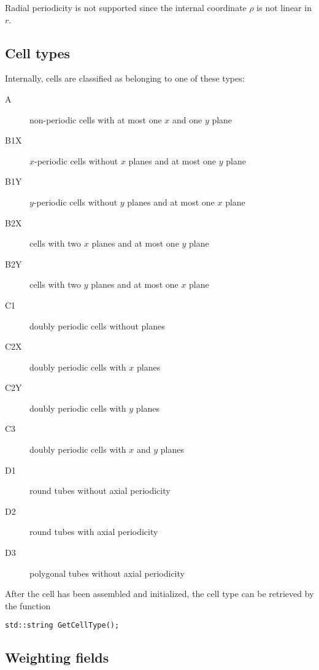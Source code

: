 Radial periodicity is not supported since the internal coordinate 
$\rho$ is not linear in $r$.

\subsection{Cell types}

Internally, cells are classified as belonging to one of these types:
\begin{description}
  \item[A]
  non-periodic cells with at most one \(x\) and one \(y\) plane
  \item[B1X]
  \(x\)-periodic cells without \(x\) planes and at most one \(y\) plane
  \item[B1Y]
  \(y\)-periodic cells without \(y\) planes and at most one \(x\) plane
  \item[B2X]
  cells with two \(x\) planes and at most one \(y\) plane
  \item[B2Y]
  cells with two \(y\) planes and at most one \(x\) plane
  \item[C1]
  doubly periodic cells without planes
  \item[C2X]
  doubly periodic cells with \(x\) planes
  \item[C2Y]
  doubly periodic cells with \(y\) planes
  \item[C3]
  doubly periodic cells with \(x\) and \(y\) planes
  \item[D1]
  round tubes without axial periodicity
  \item[D2]
  round tubes with axial periodicity
  \item[D3]
  polygonal tubes without axial periodicity
\end{description}

After the cell has been assembled and initialized, the cell type can be 
retrieved by the function
\begin{lstlisting}
std::string GetCellType();
\end{lstlisting}

\subsection{Weighting fields}

